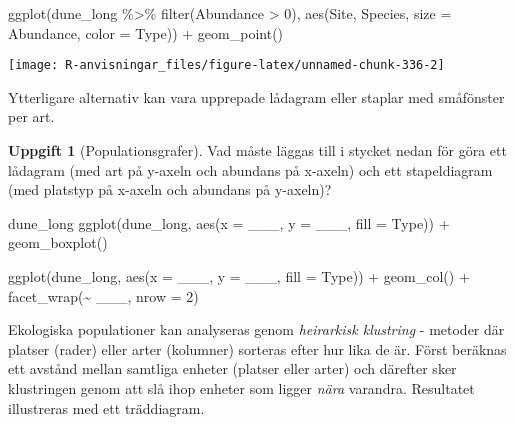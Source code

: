 \documentclass[
]{book}
\newenvironment{Shaded}{\begin{snugshade}}{\end{snugshade}}
\newcommand{\AttributeTok}[1]{\textcolor[rgb]{0.77,0.63,0.00}{#1}}
\newcommand{\DecValTok}[1]{\textcolor[rgb]{0.00,0.00,0.81}{#1}}
\newcommand{\FunctionTok}[1]{\textcolor[rgb]{0.00,0.00,0.00}{#1}}
\newcommand{\NormalTok}[1]{#1}
\newcommand{\SpecialCharTok}[1]{\textcolor[rgb]{0.00,0.00,0.00}{#1}}
\theoremstyle{definition}
\theoremstyle{definition}
\theoremstyle{definition}
\newtheorem{exercise}{Uppgift}[chapter]
\theoremstyle{definition}
\theoremstyle{remark}
\begin{document}
\begin{Shaded}
\begin{Highlighting}[]
\FunctionTok{ggplot}\NormalTok{(dune\_long }\SpecialCharTok{\%\textgreater{}\%} \FunctionTok{filter}\NormalTok{(Abundance }\SpecialCharTok{\textgreater{}} \DecValTok{0}\NormalTok{), }\FunctionTok{aes}\NormalTok{(Site, Species, }\AttributeTok{size =}\NormalTok{ Abundance, }\AttributeTok{color =}\NormalTok{ Type)) }\SpecialCharTok{+}
  \FunctionTok{geom\_point}\NormalTok{()}
\end{Highlighting}
\end{Shaded}

\begin{center}\texttt{[image: R-anvisningar\_files/figure-latex/unnamed-chunk-336-2]} \end{center}

Ytterligare alternativ kan vara upprepade lådagram eller staplar med småfönster per art.

\begin{exercise}[Populationsgrafer]

Vad måste läggas till i stycket nedan för göra ett lådagram (med art på y-axeln och abundans på x-axeln) och ett stapeldiagram (med platstyp på x-axeln och abundans på y-axeln)?

\begin{Shaded}
\begin{Highlighting}[]
\NormalTok{dune\_long}
\FunctionTok{ggplot}\NormalTok{(dune\_long, }\FunctionTok{aes}\NormalTok{(}\AttributeTok{x =}\NormalTok{ \_\_\_, }\AttributeTok{y =}\NormalTok{ \_\_\_, }\AttributeTok{fill =}\NormalTok{ Type)) }\SpecialCharTok{+}
  \FunctionTok{geom\_boxplot}\NormalTok{()}

\FunctionTok{ggplot}\NormalTok{(dune\_long, }\FunctionTok{aes}\NormalTok{(}\AttributeTok{x =}\NormalTok{ \_\_\_, }\AttributeTok{y =}\NormalTok{ \_\_\_, }\AttributeTok{fill =}\NormalTok{ Type)) }\SpecialCharTok{+}
  \FunctionTok{geom\_col}\NormalTok{() }\SpecialCharTok{+}
  \FunctionTok{facet\_wrap}\NormalTok{(}\SpecialCharTok{\textasciitilde{}}\NormalTok{ \_\_\_, }\AttributeTok{nrow =} \DecValTok{2}\NormalTok{)}
\end{Highlighting}
\end{Shaded}

\end{exercise}

Ekologiska populationer kan analyseras genom \emph{heirarkisk klustring} - metoder där platser (rader) eller arter (kolumner) sorteras efter hur lika de är. Först beräknas ett avstånd mellan samtliga enheter (platser eller arter) och därefter sker klustringen genom att slå ihop enheter som ligger \emph{nära} varandra. Resultatet illustreras med ett träddiagram.
\end{document}
